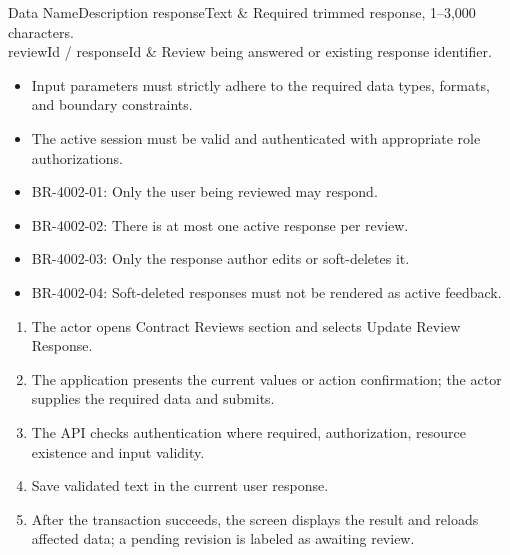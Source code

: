 
\begin{specdatatable}{Data Name}{Description}
responseText & Required trimmed response, 1--3,000 characters.\\ \hline
reviewId / responseId & Review being answered or existing response identifier.\\ \hline
\end{specdatatable}

\begin{itemize}[leftmargin=1.6em,topsep=3pt,itemsep=2pt,parsep=0pt,label=$\bullet$]
    \item Input parameters must strictly adhere to the required data types, formats, and boundary constraints.
    \item The active session must be valid and authenticated with appropriate role authorizations.
\end{itemize}

\begin{itemize}[leftmargin=1.6em,topsep=3pt,itemsep=2pt,parsep=0pt,label=$\bullet$]\brrulelist
    \item BR-4002-01: Only the user being reviewed may respond.
    \item BR-4002-02: There is at most one active response per review.
    \item BR-4002-03: Only the response author edits or soft-deletes it.
    \item BR-4002-04: Soft-deleted responses must not be rendered as active feedback.
\end{itemize}

\begin{enumerate}[leftmargin=1.8em,topsep=3pt,itemsep=2pt,parsep=0pt]
    \item The actor opens Contract Reviews section and selects Update Review Response.
    \item The application presents the current values or action confirmation; the actor supplies the required data and submits.
    \item The API checks authentication where required, authorization, resource existence and input validity.
    \item Save validated text in the current user response.
    \item After the transaction succeeds, the screen displays the result and reloads affected data; a pending revision is labeled as awaiting review.
\end{enumerate}


